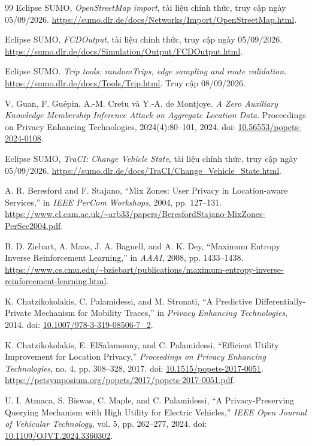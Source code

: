 \documentclass[12pt,a4paper,oneside]{report}
\begin{document}
\begin{thebibliography}{99}
Eclipse SUMO, \emph{OpenStreetMap import}, tài liệu chính thức, truy cập ngày 05/09/2026.
\url{https://sumo.dlr.de/docs/Networks/Import/OpenStreetMap.html}.

Eclipse SUMO, \emph{FCDOutput}, tài liệu chính thức, truy cập ngày 05/09/2026.
\url{https://sumo.dlr.de/docs/Simulation/Output/FCDOutput.html}.

Eclipse SUMO. \emph{Trip tools: randomTrips, edge sampling and route validation}.
\url{https://sumo.dlr.de/docs/Tools/Trip.html}. Truy cập 08/09/2026.

V. Guan, F. Guépin, A.-M. Cretu và Y.-A. de Montjoye.
\emph{A Zero Auxiliary Knowledge Membership Inference Attack on Aggregate Location Data}.
Proceedings on Privacy Enhancing Technologies, 2024(4):80--101, 2024.
doi: \href{https://doi.org/10.56553/popets-2024-0108}{10.56553/popets-2024-0108}.

Eclipse SUMO, \emph{TraCI: Change Vehicle State}, tài liệu chính thức, truy cập ngày 05/09/2026.
\url{https://sumo.dlr.de/docs/TraCI/Change_Vehicle_State.html}.

A. R. Beresford and F. Stajano,
“Mix Zones: User Privacy in Location-aware Services,”
in \emph{IEEE PerCom Workshops}, 2004, pp. 127--131.
\url{https://www.cl.cam.ac.uk/~arb33/papers/BeresfordStajano-MixZones-PerSec2004.pdf}.

B. D. Ziebart, A. Maas, J. A. Bagnell, and A. K. Dey,
“Maximum Entropy Inverse Reinforcement Learning,”
in \emph{AAAI}, 2008, pp. 1433--1438.
\url{https://www.cs.cmu.edu/~bziebart/publications/maximum-entropy-inverse-reinforcement-learning.html}.

K. Chatzikokolakis, C. Palamidessi, and M. Stronati,
“A Predictive Differentially-Private Mechanism for Mobility Traces,”
in \emph{Privacy Enhancing Technologies}, 2014.
doi: \href{https://doi.org/10.1007/978-3-319-08506-7_2}{10.1007/978-3-319-08506-7\_2}.

K. Chatzikokolakis, E. ElSalamouny, and C. Palamidessi,
``Efficient Utility Improvement for Location Privacy,''
\emph{Proceedings on Privacy Enhancing Technologies}, no. 4,
pp. 308--328, 2017.
doi: \href{https://doi.org/10.1515/popets-2017-0051}{10.1515/popets-2017-0051}.
\url{https://petsymposium.org/popets/2017/popets-2017-0051.pdf}.

U. I. Atmaca, S. Biswas, C. Maple, and C. Palamidessi,
``A Privacy-Preserving Querying Mechanism with High Utility for Electric Vehicles,''
\emph{IEEE Open Journal of Vehicular Technology}, vol. 5, pp. 262--277, 2024.
doi: \href{https://doi.org/10.1109/OJVT.2024.3360302}{10.1109/OJVT.2024.3360302}.


\end{thebibliography}
\end{document}
